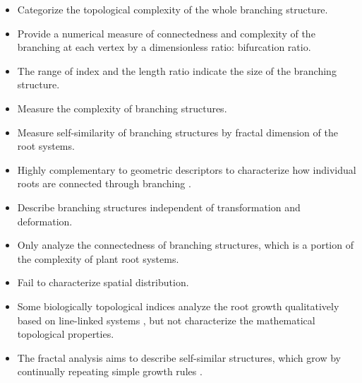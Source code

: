          \begin{itemize}
            \item Categorize the topological complexity of the whole branching structure.
            \item Provide a numerical measure of connectedness and complexity of the branching at each vertex by a dimensionless ratio: bifurcation ratio.
            \item The range of index and the length ratio indicate the size of the branching structure.
         \end{itemize}
                
         \begin{itemize}
            \item Measure the complexity of branching structures.
            \item Measure self-similarity of branching structures by fractal dimension of the root systems.
         \end{itemize}

       \begin{itemize}    
         \item Highly complementary to geometric descriptors to characterize how individual roots are connected through branching \cite{delory2018archidart}.
         \item Describe branching structures independent of transformation and deformation.
       \end{itemize}
       

       \begin{itemize}
         \item Only analyze the connectedness of branching structures, which is a portion of the complexity of plant root systems.
         \item Fail to characterize spatial distribution.
         \item Some biologically topological indices analyze the root growth qualitatively based on line-linked systems \cite{fitter1986topology}, but not characterize the mathematical topological properties.
         \item The fractal analysis aims to describe self-similar structures, which grow by continually repeating simple growth rules \cite{fitter1992fractal}.
       \end{itemize}
       
